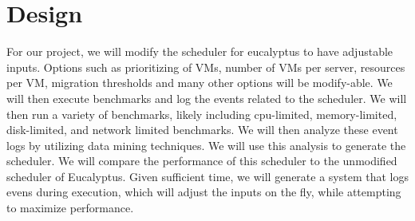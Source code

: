 \section{Design}

For our project, we will modify the scheduler for eucalyptus to have adjustable
inputs.  Options such as prioritizing of VMs, number of VMs per server,
resources per VM, migration thresholds and many other options will be
modify-able.  We will then execute benchmarks and log the events related to the
scheduler.  We will then run a variety of benchmarks, likely including
cpu-limited, memory-limited, disk-limited, and network limited benchmarks.  We
will then analyze these event logs by utilizing data mining techniques.  We will
use this analysis to generate the scheduler.  We will compare the performance of
this scheduler to the unmodified scheduler of Eucalyptus.  Given sufficient
time, we will generate a system that logs evens during execution, which will
adjust the inputs on the fly, while attempting to maximize performance.
